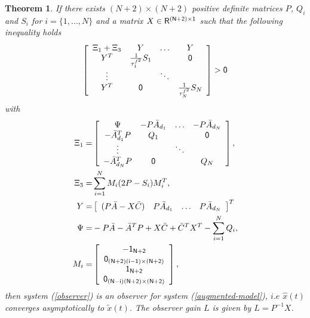 \documentclass[a4paper, 10pt, onecolumn]{article}
\newtheorem{theorem}{Theorem}
\begin{document}
\begin{theorem}
\label{theorem2}
If there exists $(N+2)\times (N+2)$ positive definite matrices $P$, $Q_{i}$ and $S_{i}$ for $i=\{1,...,N\}$ and a matrix $X\in\sf{R}^{(N+2)\times 1}$ such that the following inequality holds
\begin{equation}
\label{cond-theorem}
\left[\begin{array}{cccc}
\Xi_1+\Xi_3&Y&\ldots&Y\\
Y^T&\frac{1}{\tau_1^{f^2}}S_1&&\sf{0}\\
\vdots&&\ddots&\\
Y^T&\sf{0}&&\frac{1}{\tau_N^{f^2}}S_N
\end{array}\right]>\sf{0}
\end{equation}
with
\begin{align}
\label{def-xi1}
\Xi_1=&\left[\begin{array}{cccc}\Psi&-P\bar{A}_{d_1}&\ldots&-P\bar{A}_{d_N}\\-\bar{A}^T_{d_1}P&Q_1&&\sf{0}\\ \vdots &&\ddots&\\-\bar{A}^T_{d_N}P&\sf{0}&&Q_N \end{array}\right],\\
\label{def-xi3}
\Xi_3=&\sum_{i=1}^NM_i(2P-S_i)M_i^T,\\
Y=&\left[\begin{array}{cccc}(P\bar A-X\bar C)& P\bar A_{d_1}& \ldots& P\bar A_{d_N}\end{array}\right]^T\\
\Psi=&-P\bar{A}-\bar{A}^TP+X\bar C+\bar C^T X^T-\sum_{i=1}^NQ_i,\\
\label{def-Mi}
M_i=&\left[\begin{array}{c}-\sf{1}_{N+2}\\ \sf{0}_{(N+2)(i-1)\times(N+2)} \\ \sf{1}_{N+2} \\ \sf{0}_{(N-i)(N+2)\times(N+2)}\end{array}\right],
\end{align}
then system (\ref{observer}) is an observer for system (\ref{augmented-model}), $i.e$ $\hat{x}(t)$ converges asymptotically to $\tilde{x}(t)$. The observer gain $L$ is given by $L=P^{-1}X$.
\end{theorem}
\end{document}
